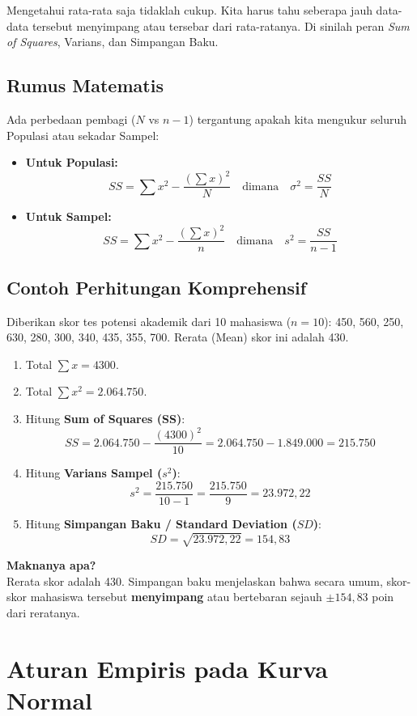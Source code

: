 \documentclass[12pt,a4paper]{article}
\begin{document}
Mengetahui rata-rata saja tidaklah cukup. Kita harus tahu seberapa jauh data-data tersebut menyimpang atau tersebar dari rata-ratanya. Di sinilah peran \textit{Sum of Squares}, Varians, dan Simpangan Baku.

\subsection{Rumus Matematis}
Ada perbedaan pembagi ($N$ vs $n-1$) tergantung apakah kita mengukur seluruh Populasi atau sekadar Sampel:
\begin{itemize}
    \item \textbf{Untuk Populasi:}
    $$ SS = \sum x^2 - \frac{(\sum x)^2}{N} \quad \text{dimana} \quad \sigma^2 = \frac{SS}{N} $$
    \item \textbf{Untuk Sampel:}
    $$ SS = \sum x^2 - \frac{(\sum x)^2}{n} \quad \text{dimana} \quad s^2 = \frac{SS}{n-1} $$
\end{itemize}

\subsection{Contoh Perhitungan Komprehensif}
Diberikan skor tes potensi akademik dari 10 mahasiswa ($n=10$): 450, 560, 250, 630, 280, 300, 340, 435, 355, 700. Rerata (Mean) skor ini adalah 430.
\begin{enumerate}
    \item Total $\sum x = 4300$.
    \item Total $\sum x^2 = 2.064.750$.
    \item Hitung \textbf{Sum of Squares (SS)}:
    $$ SS = 2.064.750 - \frac{(4300)^2}{10} = 2.064.750 - 1.849.000 = 215.750 $$
    \item Hitung \textbf{Varians Sampel ($s^2$)}:
    $$ s^2 = \frac{215.750}{10 - 1} = \frac{215.750}{9} = 23.972,22 $$
    \item Hitung \textbf{Simpangan Baku / Standard Deviation ($SD$)}:
    $$ SD = \sqrt{23.972,22} = 154,83 $$
\end{enumerate}

\textbf{Maknanya apa?}\\
Rerata skor adalah 430. Simpangan baku menjelaskan bahwa secara umum, skor-skor mahasiswa tersebut \textbf{menyimpang} atau bertebaran sejauh $\pm 154,83$ poin dari reratanya.

\newpage
\section{Aturan Empiris pada Kurva Normal}
\end{document}
